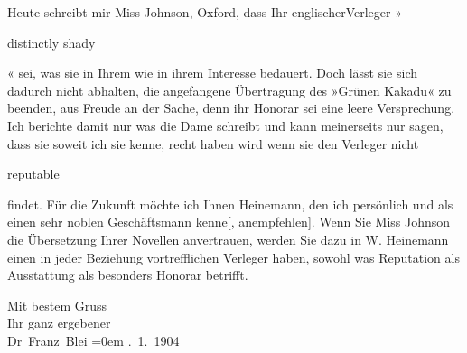 \pstart
           Heute schreibt mir Miss Johnson, Oxford, dass Ihr englischerVerleger »\begin{otherlanguage}{english}distinctly shady\end{otherlanguage}« sei, was sie in Ihrem wie in ihrem
               Interesse bedauert. Doch lässt sie sich dadurch nicht abhalten, die angefangene
               Übertragung des »Grünen Kakadu« {\pb}zu beenden, aus Freude an der Sache, denn
               ihr Honorar sei eine leere Versprechung. Ich berichte damit nur was die Dame schreibt und kann
               meinerseits nur sagen, dass sie soweit ich sie kenne, recht haben wird wenn sie den
                  Verleger nicht \begin{otherlanguage}{english}reputable\end{otherlanguage} findet. Für die Zukunft möchte ich Ihnen Heinemann, den ich persönlich und als einen sehr
               noblen Geschäftsmann {\pb}kenne{[},
                  anempfehlen{]}. Wenn Sie Miss Johnson die Übersetzung Ihrer Novellen anvertrauen, werden Sie dazu in W. Heinemann einen in jeder Beziehung
               vortrefflichen Verleger haben, sowohl was Reputation als Ausstattung als besonders
               Honorar betrifft.\pend
           
\pstart
           Mit bestem Gruss{\\[\baselineskip]}Ihr ganz ergebener{\\[\baselineskip]}\spacefill\mbox{Dr Franz Blei}\pend
           \leftskip=0em{}
. 1. 1904\pend
           \endnumbering{}  \newcommand{\dateiname}{L01356}\newcommand{\titel}{Franz Blei an Arthur Schnitzler, 4. 1. 1904}\newcommand{\editorInnen}{Martin Anton Müller und Gerd-Hermann Susen}
